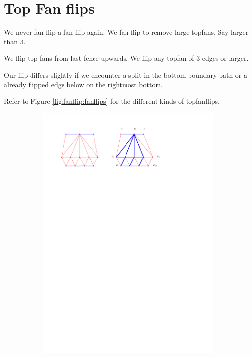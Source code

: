 
\section{Top Fan flips}

We never fan flip a fan flip again. We fan flip to remove large topfans. Say larger than 3.


We flip top fans from last fence upwards. We flip any topfan of 3 edges or larger.

Our flip differs slightly if we encounter a split in the bottom boundary path or a already flipped edge below on the rightmost bottom.

Refer to Figure \ref{fig:fanflip:fanflips} for the different kinds of topfanflips.


\begin{figure}
    \centering
    \begin{subfigure}[b]{0.8 \textwidth}
        \includegraphics[width = \textwidth]{topFanFlips/img/regular}

\end{subfigure}
\end{figure}

